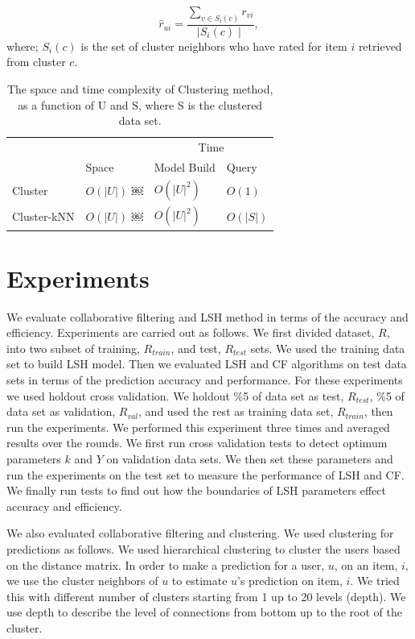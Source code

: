\documentclass[conference]{IEEEtran}
\begin{document}
\begin{equation}
\hat{r}_{ui} = \frac{\sum\limits_{v \in S_i(c)} r_{vi}}{\mid S_i(c) \mid} ,
\label{eq:cluster-prediction}
\end{equation}
where; $S_i(c)$ is the set of cluster neighbors who have rated for item $i$ retrieved from cluster $c$.

\begin{table}
\centering
\begin{tabular}{llll}
\hline
& & \multicolumn {2}{c}{Time} \\
\cline{3-4}
     & Space & Model Build  & Query \\
\hline
Cluster & $O(|U|)$ ￼& $O(|U|^2)$ &$O(1)$ \\
Cluster-kNN & $O(|U|)$ ￼& $O(|U|^2)$ &$O(|S|)$ \\
\hline
\end{tabular}
\caption{The space and time complexity of Clustering  method, as a function of U and S, where S is the clustered data set.}
\label{table:complexity-clustering}
\end{table}


\section{Experiments}
\label{sec:experiements}

We evaluate collaborative filtering and LSH method in terms of the accuracy 
and efficiency. Experiments are carried out as follows. We first divided 
dataset, $R$, into two subset of training, $R_{train}$, and test, $R_{test}$ 
sets. We used the training data set to build LSH model. Then we evaluated LSH 
and CF algorithms on test data sets in terms of the prediction accuracy and
performance. For these experiments we used holdout cross validation. We holdout
\%5 of data set as test, $R_{test}$, \%5 of data set as validation, $R_{val}$, 
and used the rest as training data set, $R_{train}$, then run the experiments. 
We performed this experiment three times and averaged results over the rounds. 
We first run cross validation tests to detect optimum parameters $k$ and $Y$ on 
validation data sets. We then set these parameters and run the experiments on 
the test set to measure the performance of LSH and CF. We finally run tests to 
find out how the boundaries of LSH parameters effect accuracy and efficiency. 

We also evaluated collaborative filtering and clustering. We used clustering for 
predictions as follows. We used hierarchical clustering to cluster the users 
based on the distance matrix. In order to make a prediction for a user, $u$, on
an item, $i$, we use the cluster neighbors of $u$ to estimate $u$'s prediction 
on item, $i$. We tried this with different number of clusters starting from 1 
up to 20 levels (depth). We use depth to describe the level of connections from
bottom up to the root of the cluster.
\end{document}

